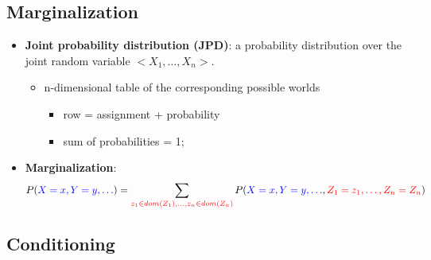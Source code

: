 \documentclass{article}
\begin{document}
\subsection{Marginalization}

\begin{itemize}
    \item \textbf{Joint probability distribution (JPD)}: a probability distribution over the joint random variable $<X_1, \ldots, X_n>$.
        \begin{itemize}
            \item n-dimensional table of the corresponding possible worlds
                \begin{itemize}
                    \item row = assignment + probability
                    \item sum of probabilities = 1;
                \end{itemize}
        \end{itemize}
    \item \textbf{Marginalization}:
        \begin{equation*}
            P(\textcolor{blue}{X = x, Y = y, \ldots}) = \sum_{\textcolor{red}{z_1 \in dom(Z_1), \ldots, z_n \in dom(Z_n)}} P(\textcolor{blue}{X = x, Y = y, \ldots}, \textcolor{red}{Z_1 = z_1, \ldots, Z_n = Z_n})
        \end{equation*}
\end{itemize}

\subsection{Conditioning}
\end{document}
